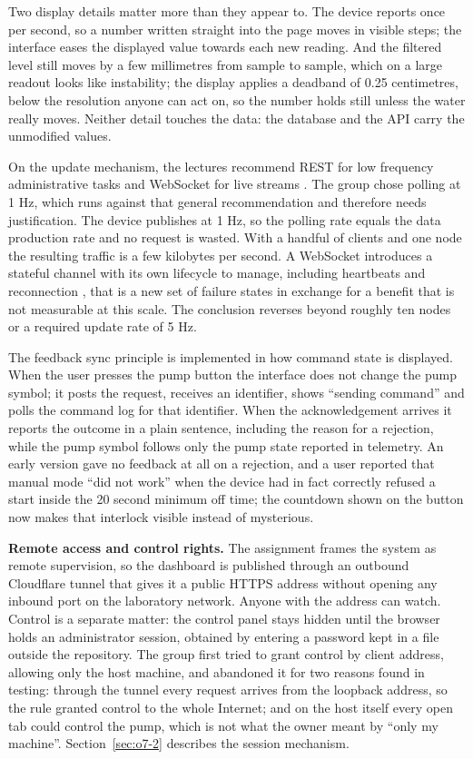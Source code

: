 Two display details matter more than they appear to. The device reports once per second, so a number written straight into the page moves in visible steps; the interface eases the displayed value towards each new reading. And the filtered level still moves by a few millimetres from sample to sample, which on a large readout looks like instability; the display applies a deadband of 0.25 centimetres, below the resolution anyone can act on, so the number holds still unless the water really moves. Neither detail touches the data: the database and the API carry the unmodified values.

On the update mechanism, the lectures recommend REST for low frequency administrative tasks and WebSocket for live streams \cite{slide06, rfc6455}. The group chose polling at 1 Hz, which runs against that general recommendation and therefore needs justification. The device publishes at 1 Hz, so the polling rate equals the data production rate and no request is wasted. With a handful of clients and one node the resulting traffic is a few kilobytes per second. A WebSocket introduces a stateful channel with its own lifecycle to manage, including heartbeats and reconnection \cite{slide06}, that is a new set of failure states in exchange for a benefit that is not measurable at this scale. The conclusion reverses beyond roughly ten nodes or a required update rate of 5 Hz.

The feedback sync principle is implemented in how command state is displayed. When the user presses the pump button the interface does not change the pump symbol; it posts the request, receives an identifier, shows ``sending command'' and polls the command log for that identifier. When the acknowledgement arrives it reports the outcome in a plain sentence, including the reason for a rejection, while the pump symbol follows only the pump state reported in telemetry. An early version gave no feedback at all on a rejection, and a user reported that manual mode ``did not work'' when the device had in fact correctly refused a start inside the 20 second minimum off time; the countdown shown on the button now makes that interlock visible instead of mysterious.

\textbf{Remote access and control rights.} The assignment frames the system as remote supervision, so the dashboard is published through an outbound Cloudflare tunnel that gives it a public HTTPS address without opening any inbound port on the laboratory network. Anyone with the address can watch. Control is a separate matter: the control panel stays hidden until the browser holds an administrator session, obtained by entering a password kept in a file outside the repository. The group first tried to grant control by client address, allowing only the host machine, and abandoned it for two reasons found in testing: through the tunnel every request arrives from the loopback address, so the rule granted control to the whole Internet; and on the host itself every open tab could control the pump, which is not what the owner meant by ``only my machine''. Section~\ref{sec:o7-2} describes the session mechanism.

